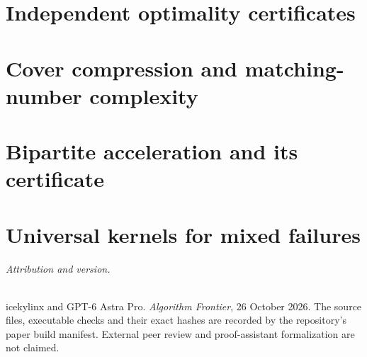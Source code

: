 \part{Independent optimality certificates}
\setcounter{section}{0}
\renewcommand{\thesection}{\thepart.\arabic{section}}


\part{Cover compression and matching-number complexity}
\setcounter{section}{0}


\part{Bipartite acceleration and its certificate}
\setcounter{section}{0}


\part{Universal kernels for mixed failures}
\setcounter{section}{0}


\paragraph{Attribution and version.}
icekylinx and GPT-6 Astra Pro. \emph{Algorithm Frontier}, 26 October 2026.
The source files, executable checks and their exact hashes are recorded by
the repository's paper build manifest. External peer review and proof-assistant
formalization are not claimed.

